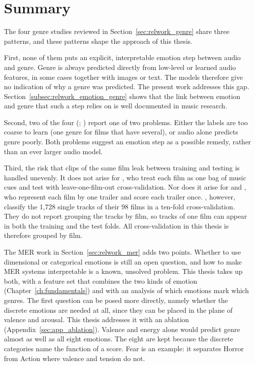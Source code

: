\section{Summary}
\label{sec:relwork_summary}

The four genre studies reviewed in Section~\ref{sec:relwork_genre} share three patterns, and these patterns shape the approach of this thesis.

First, none of them puts an explicit, interpretable emotion step between audio and genre. Genre is always predicted directly from low-level or learned audio features, in some cases together with images or text. The models therefore give no indication of why a genre was predicted. The present work addresses this gap. Section~\ref{subsec:relwork_emotion_genre} shows that the link between emotion and genre that such a step relies on is well documented in music research.

Second, two of the four (\citealp{austin2010characterization}; \citealp{mangolin2020multimodal}) report one of two problems. Either the labels are too coarse to learn (one genre for films that have several), or audio alone predicts genre poorly. Both problems suggest an emotion step as a possible remedy, rather than an ever larger audio model.

Third, the risk that clips of the same film leak between training and testing is handled unevenly. It does not arise for \citet{ma2021computational}, who treat each film as one bag of music cues and test with leave-one-film-out cross-validation. Nor does it arise for \citet{mangolin2020multimodal} and \citet{behrouzi2023multimodal}, who represent each film by one trailer and score each trailer once. \citet{austin2010characterization}, however, classify the 1{,}728 single tracks of their 98 films in a ten-fold cross-validation. They do not report grouping the tracks by film, so tracks of one film can appear in both the training and the test folds. All cross-validation in this thesis is therefore grouped by film.

The MER work in Section~\ref{sec:relwork_mer} adds two points. Whether to use dimensional or categorical emotions is still an open question, and how to make MER systems interpretable is a known, unsolved problem. This thesis takes up both, with a feature set that combines the two kinds of emotion (Chapter~\ref{ch:fundamentals}) and with an analysis of which emotions mark which genres. The first question can be posed more directly, namely whether the discrete emotions are needed at all, since they can be placed in the plane of valence and arousal. This thesis addresses it with an ablation (Appendix~\ref{sec:app_ablation}). Valence and energy alone would predict genre almost as well as all eight emotions. The eight are kept because the discrete categories name the function of a score. Fear is an example: it separates Horror from Action where valence and tension do not.
